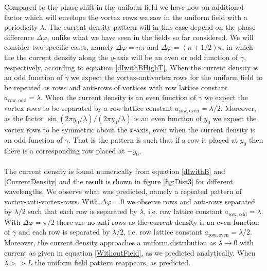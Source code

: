 Compared to the phase shift in the uniform field we have now an additional factor which will envelope the vortex rows we saw in the uniform field with a periodicity $\lambda$. The current density pattern will in this case depend on the phase difference $\Delta \varphi$, unlike what we have seen in the fields so far considered. We will consider two specific cases, namely $\Delta \varphi = n\pi$ and $\Delta \varphi = (n+1/2)\pi$, in which the the current density along the $y$-axis will be an even or odd function of $\gamma$, respectively, according to equation \eqref{dIwithBHighT}. When the current density is an odd function of $\gamma$ we expect the vortex-antivortex rows for the uniform field to be repeated as rows and anti-rows of vortices with row lattice constant $a_{\mathrm{row,odd}} = \lambda$. When the current density is an even function of $\gamma$ we expect the vortex rows to be separated by a row lattice constant $a_{\mathrm{row,even}} = \lambda/2$. Moreover, as the factor $\sin(2\pi y_0/\lambda)/(2\pi y_0/\lambda)$ is an even function of $y_0$ we expect the vortex rows to be symmetric about the $x$-axis, even when the current density is an odd function of $\gamma$. That is the pattern is such that if a row is placed at $y_0$ then there is a corresponding row placed at $-y_0$.
\\
\\
The current density is found numerically from equation \eqref{dIwithB} and \eqref{CurrentDensity} and the result is shown in figure \ref{fig:Dist3} for different wavelengths. We observe what was predicted, namely a repeated pattern of vortex-anti-vortex-rows. With $\Delta \varphi = 0$ we observe rows and anti-rows separated by $\lambda/2$ such that each row is separated by $\lambda$, i.e. row lattice constant $a_{\mathrm{row,odd}}=\lambda$. With $\Delta \varphi = \pi/2$ there are no anti-rows as the current density is an even function of $\gamma$ and each row is separated by $\lambda/2$, i.e. row lattice constant $a_{\mathrm{row,even}}=\lambda/2$. Moreover, the current density approaches a uniform distribution as $\lambda \rightarrow 0$ with current as given in equation \eqref{WithoutField}, as we predicted analytically. When $\lambda >> L$ the uniform field pattern reappears, as predicted. 
